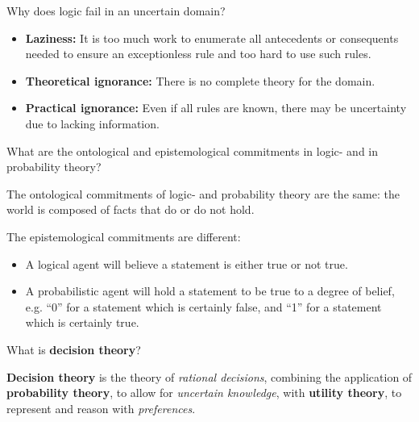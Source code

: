
\begin{flashcard}[Question]{Why does logic fail in an uncertain domain?}

\begin{itemize}
\item \textbf{Laziness:} It is too much work to enumerate all antecedents or consequents needed to ensure an exceptionless rule and too hard to use such rules.
\item \textbf{Theoretical ignorance:} There is no complete theory for the domain.
\item \textbf{Practical ignorance:} Even if all rules are known, there may be uncertainty due to lacking information.
\end{itemize}

\end{flashcard}

\begin{flashcard}[Question]{What are the ontological and epistemological commitments in logic- and in probability theory?}

The ontological commitments of logic- and probability theory are the same: the world is composed of facts that do or do not hold.

\medskip

The epistemological commitments are different:

\begin{itemize}
\item A logical agent will believe a statement is either true or not true.
\item A probabilistic agent will hold a statement to be true to a degree of belief, e.g. ``0'' for a statement which is certainly false, and ``1'' for a statement which is certainly true.
\end{itemize}

\end{flashcard}

\begin{flashcard}[Question]{What is \textbf{decision theory}?}

\textbf{Decision theory} is the theory of \textit{rational decisions}, combining the application of \textbf{probability theory}, to allow for \textit{uncertain knowledge}, with \textbf{utility theory}, to represent and reason with \textit{preferences}.

\end{flashcard}

